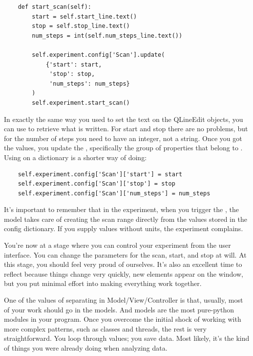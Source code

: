 \begin{verbatim}
    def start_scan(self):
        start = self.start_line.text()
        stop = self.stop_line.text()
        num_steps = int(self.num_steps_line.text())

        self.experiment.config['Scan'].update(
            {'start': start,
             'stop': stop,
             'num_steps': num_steps}
        )
        self.experiment.start_scan()
\end{verbatim}

In exactly the same way you used  to set the text on the QLineEdit objects, you can use  to retrieve what is written. For start and stop there are no problems, but for the number of steps you need to have an integer, not a string. Once you got the values, you update the , specifically the group of properties that belong to . Using  on a dictionary is a shorter way of doing:

\begin{verbatim}
    self.experiment.config['Scan']['start'] = start
    self.experiment.config['Scan']['stop'] = stop
    self.experiment.config['Scan']['num_steps'] = num_steps
\end{verbatim}

It's important to remember that in the experiment, when you trigger the , the model takes care of creating the scan range directly from the values stored in the config dictionary. If you supply values without units, the experiment complains.



You're now at a stage where you can control your experiment from the user interface. You can change the parameters for the scan, start, and stop at will. At this stage, you should feel very proud of ourselves. It's also an excellent time to reflect because things change very quickly, new elements appear on the window, but you put minimal effort into making everything work together.

One of the values of separating in Model/View/Controller is that, usually, most of your work should go in the models. And models are the most pure-python modules in your program. Once you overcome the initial shock of working with more complex patterns, such as classes and threads, the rest is very straightforward. You loop through values; you save data. Most likely, it's the kind of things you were already doing when analyzing data.

